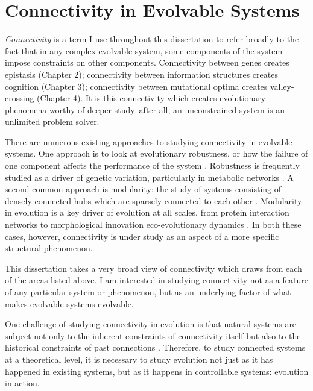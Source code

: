 \section{Connectivity in Evolvable Systems}

\textit{Connectivity} is a term I use throughout this dissertation to refer broadly to the fact that in any complex evolvable system, some components of the system impose constraints on other components. Connectivity between genes creates epistasis (Chapter 2); connectivity between information structures creates cognition (Chapter 3); connectivity between mutational optima creates valley-crossing (Chapter 4). It is this connectivity which creates evolutionary phenomena worthy of deeper study--after all, an unconstrained system is an unlimited problem solver. 

There are numerous existing approaches to studying connectivity in evolvable systems. One approach is to look at evolutionary robustness, or how the failure of one component affects the performance of the system \citep{wagner_robustness_2007, masel_robustness_2009}. Robustness is frequently studied as a driver of genetic variation, particularly in metabolic networks \citep{handorf_expanding_2005, felix_robustness_2008}. A second common approach is modularity: the study of systems consisting of densely connected hubs which are sparsely connected to each other \citep{wagner_road_2007, clune_evolutionary_2013, melo_modularity_2016}. Modularity in evolution is a key driver of evolution at all scales, from
protein interaction networks \citep{han_evidence_2004} to
morphological innovation \citep{parsons_constraint_2012}
eco-evolutionary dynamics \citep{fletcher_network_2013}. In both these cases, however, connectivity is under study as an aspect of a more specific structural phenomenon.

This dissertation takes a very broad view of connectivity which draws from each of the areas listed above. I am interested in studying connectivity not as a feature of any particular system or phenomenon, but as an underlying factor of what makes evolvable systems evolvable. 

One challenge of studying connectivity in evolution is that natural systems are subject not only to the inherent constraints of connectivity itself but also to the historical constraints of past connections \citep{blount_historical_2008}. Therefore, to study connected systems at a theoretical level, it is necessary to study evolution not just as it has happened in existing systems, but as it happens in controllable systems: evolution in action.